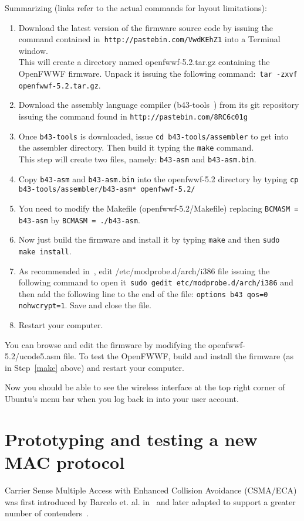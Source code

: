 \documentclass[conference]{IEEEtran}
\begin{document}
Summarizing (links refer to the actual commands for layout limitations):
\begin{enumerate}
	\item Download the latest version of the firmware source code by issuing the command contained in~\texttt{http://pastebin.com/VwdKEhZ1} into a Terminal window. \\ This will create a directory named  openfwwf-5.2.tar.gz containing the OpenFWWF firmware. Unpack it issuing the following command:~\texttt{tar -zxvf openfwwf-5.2.tar.gz}.
	\item Download the assembly language compiler (b43-tools~\cite{b43-tools}) from its git repository issuing the command found in \texttt{http://pastebin.com/8RC6c01g}
	\item Once \texttt{b43-tools} is downloaded, issue \texttt{cd b43-tools/assembler} to get into the assembler directory. Then build it typing the \texttt{make} command.\\ This step will create two files, namely: \texttt{b43-asm} and \texttt{b43-asm.bin}.
	\item Copy \texttt{b43-asm} and \texttt{b43-asm.bin} into the openfwwf-5.2 directory by typing \texttt{cp b43-tools/assembler/b43-asm* openfwwf-5.2/}
	\item You need to modify the Makefile (openfwwf-5.2/Makefile) replacing \texttt{BCMASM = b43-asm} by \texttt{BCMASM = ./b43-asm}.
	\item Now just build the firmware and install it by typing \texttt{make} and then \texttt{sudo make install}.\label{make}
	\item As recommended in~\cite{OpenFWWF}, edit /etc/modprobe.d/arch/i386 file issuing the following command to open it~\texttt{sudo gedit etc/modprobe.d/arch/i386} and then add the following line to the end of the file: \texttt{options b43 qos=0 nohwcrypt=1}. Save and close the file.
	\item Restart your computer.
\end{enumerate}

You can browse and edit the firmware by modifying the openfwwf-5.2/ucode5.asm file. To test the OpenFWWF, build and install the firmware (as in Step~\ref{make} above) and restart your computer.

Now you should be able to see the wireless interface at the top right corner of Ubuntu's menu bar when you log back in into your user account.

\section{Prototyping and testing a new MAC protocol}
Carrier Sense Multiple Access with Enhanced Collision Avoidance (CSMA/ECA) was first introduced by Barcelo et. al. in~\cite{barcelo2008lba} and later adapted to support a greater number of contenders~\cite{research2standards}. 
\end{document}
